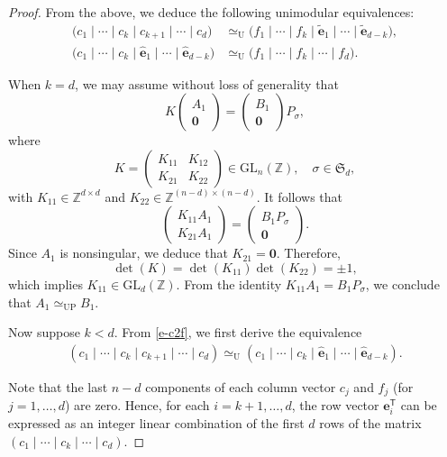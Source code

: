 \documentclass[reqno, 12pt]{article}
\theoremstyle{mydefinition}
\theoremstyle{myremark}
\numberwithin{algorithm}{section}
\begin{document}
\begin{proof}
From the above, we deduce the following unimodular equivalences:
\begin{align}
\big( c_1 \mid \cdots \mid c_k \mid c_{k+1} \mid \cdots \mid c_{d} \big) &\simeq_{\mathrm{U}} \big( f_1 \mid \cdots \mid f_k \mid \widetilde{\mathbf{e}}_{1} \mid \cdots \mid \widetilde{\mathbf{e}}_{d-k} \big), \label{e-c2f} \\
\big( c_1 \mid \cdots \mid c_k \mid \widehat{\mathbf{e}}_{1} \mid \cdots \mid \widehat{\mathbf{e}}_{d-k} \big) &\simeq_{\mathrm{U}} \big( f_1 \mid \cdots \mid f_k \mid \cdots \mid f_{d} \big). \label{e-f2c}
\end{align}

When $k = d$, we may assume without loss of generality that
\[
K \begin{pmatrix} A_1 \\ \mathbf{0} \end{pmatrix} = \begin{pmatrix} B_1 \\ \mathbf{0} \end{pmatrix} P_\sigma,
\]
where
\[
K = \begin{pmatrix} K_{11} & K_{12} \\ K_{21} & K_{22} \end{pmatrix} \in \mathrm{GL}_n(\mathbb{Z}), \quad \sigma \in \mathfrak{S}_d,
\]
with $K_{11} \in \mathbb{Z}^{d \times d}$ and $K_{22} \in \mathbb{Z}^{(n-d) \times (n-d)}$.
It follows that
\[
\begin{pmatrix} K_{11}A_1 \\ K_{21}A_1 \end{pmatrix} = \begin{pmatrix} B_1P_\sigma \\ \mathbf{0} \end{pmatrix}.
\]
Since $A_1$ is nonsingular, we deduce that $K_{21} = \mathbf{0}$. Therefore,
\[
\det(K) = \det(K_{11})\det(K_{22}) = \pm 1,
\]
which implies $K_{11} \in \mathrm{GL}_d(\mathbb{Z})$. From the identity $K_{11}A_1 = B_1P_\sigma$, we conclude that $A_1 \simeq_{\mathrm{UP}} B_1$.


Now suppose $k < d$. From \eqref{e-c2f}, we first derive the equivalence
\begin{align}
\label{e-c2cp}
(c_1 \mid \cdots \mid c_k \mid c_{k+1} \mid \cdots \mid c_d) \simeq_{\mathrm{U}} (c_1 \mid \cdots \mid c_k \mid \widehat{\mathbf{e}}_1 \mid \cdots \mid \widehat{\mathbf{e}}_{d-k}).
\end{align}

Note that the last $n - d$ components of each column vector $c_j$ and $f_j$ (for $j = 1, \dots, d$) are zero. Hence, for each $i = k+1, \dots, d$, the row vector $\mathbf{e}_i^\mathsf{T}$ can be expressed as an integer linear combination of the first \(d\) rows of the matrix \((c_1 \mid \cdots \mid c_k \mid \cdots \mid c_{d})\).


\end{proof}
\end{document}
